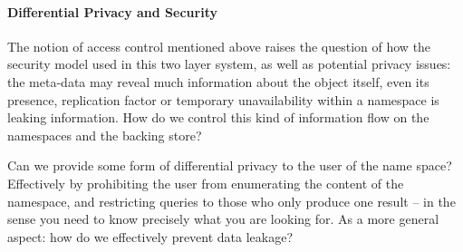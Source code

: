 






\paragraph{Differential Privacy and Security}
The notion of access control mentioned above raises the question of how the security model used in this two layer system, as well as potential privacy issues: the meta-data may reveal much information about the object itself, even its presence, replication factor or temporary unavailability within a namespace is leaking information. How do we control this kind of information flow on the namespaces and the backing store?

Can we provide some form of differential privacy to the user of the name space? Effectively by prohibiting the user from enumerating the content of the namespace, and restricting queries to those who only produce one result -- in the sense you need to know precisely what you are looking for. As a more general aspect: how do we effectively prevent data leakage? 

